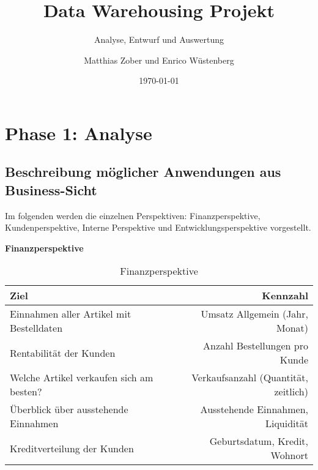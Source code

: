 	
					
\title{Data Warehousing Projekt}
\subtitle{Analyse, Entwurf und Auswertung}

\author{Matthias Zober und Enrico Wüstenberg\vspace{5cm}}
\date{\today}


\maketitle
\tableofcontents
\thispagestyle{empty}
\pagebreak
\setcounter{page}{1}

\section{Phase 1: Analyse}

\subsection{Beschreibung möglicher Anwendungen aus Business-Sicht}
\label{ref:businessSicht}
Im folgenden werden die einzelnen Perspektiven: Finanzperspektive, Kundenperspektive, Interne Perspektive und Entwicklungsperspektive vorgestellt.

\begin{table}[h]
\textbf{Finanzperspektive}
\begin{center}
  \begin{tabular}{ | l | r | }
    \hline
    \textbf{Ziel} & \textbf{Kennzahl} \\ \hline
    Einnahmen aller Artikel mit Bestelldaten & Umsatz Allgemein (Jahr, Monat) \\ \hline
    Rentabilität der Kunden & Anzahl Bestellungen pro Kunde \\
    \hline
    Welche Artikel verkaufen sich am besten? & Verkaufsanzahl (Quantität, zeitlich) \\
    \hline
    Überblick über ausstehende Einnahmen  & Ausstehende Einnahmen,  Liquidität  \\
    \hline
     Kreditverteilung der Kunden & Geburtsdatum, Kredit, Wohnort \\
    \hline
  \end{tabular}
\end{center}
\caption{Finanzperspektive}
\label{table:tableFinanz}
\end{table}

